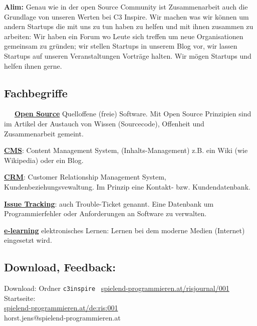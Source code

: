 \textbf{Alim:} Genau wie in der open Source Community ist Zusammenarbeit auch 
die Grundlage von unseren Werten bei C3 Inspire. Wir machen was wir 
können um andern Startups die mit uns zu tun haben zu helfen und mit 
ihnen zusammen zu arbeiten: Wir haben ein Forum wo Leute sich treffen 
um neue Organisationen gemeinsam zu gründen; wir stellen Startups in 
unserem Blog vor,  wir lassen Startups auf unseren Veranstaltungen 
Vorträge halten. Wir mögen Startups und helfen ihnen gerne.


\subsection*{Fachbegriffe}
~~~\href{https://de.wikipedia.org/wiki/Portal:Freie_Software}{\textbf{Open Source}} Quelloffene (freie) Software. Mit Open Source Prinzipien sind im Artikel der Austauch von Wissen (Sourcecode), Offenheit und Zusammenarbeit gemeint. 

\href{https://de.wikipedia.org/wiki/Content-Management-System}{\textbf{CMS}}: Content Management System, (Inhalts-Management) z.B. ein Wiki (wie Wikipedia) oder ein Blog. 

\href{https://de.wikipedia.org/wiki/Customer-Relationship-Management}{\textbf{CRM}}: Customer Relationship Management System, Kundenbeziehungsvewaltung. Im Prinzip eine Kontakt- bzw. Kundendatenbank.

\href{https://de.wikipedia.org/wiki/Issue-Tracking-System}{\textbf{Issue Tracking}}: auch Trouble-Ticket genannt. Eine Datenbank um Programmierfehler oder Anforderungen an Software zu verwalten. 

\href{https://de.wikipedia.org/wiki/ELearning}{\textbf{e-learning}} elektronisches Lernen: Lernen bei dem moderne Medien (Internet) eingesetzt wird.

\subsection*{Download, Feedback:}
\footnotesize{
Download: Ordner \texttt{c3inspire} \Mundus\ \href{http://spielend-programmieren.at/risjournal/001}{spielend-programmieren.at/risjournal/001}\\
Startseite:\\
\href{http://spielend-programmieren.at/de:ris:001}{spielend-programmieren.at/de:ris:001}\\ 
\Letter\: horst.jens@spielend-programmieren.at}
\normalsize

